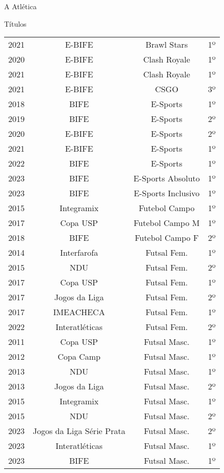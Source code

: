 \begin{secao}{A Atlética}
\begin{subsecao}{Títulos}
\begin{center}
\begin{tabular}{|c|c|c|c|}
    2021 & E-BIFE         & Brawl Stars     & 1º\\
    2020 & E-BIFE         & Clash Royale    & 1º\\
    2021 & E-BIFE         & Clash Royale    & 1º\\
    2021 & E-BIFE         & CSGO            & 3º\\
    2018 & BIFE           & E-Sports        & 1º\\
    2019 & BIFE           & E-Sports        & 2º\\
    2020 & E-BIFE         & E-Sports        & 2º\\
    2021 & E-BIFE         & E-Sports        & 1º\\
    2022 & BIFE           & E-Sports        & 1º\\
    2023 & BIFE           & E-Sports Absoluto  & 1º\\
    2023 & BIFE           & E-Sports Inclusivo & 1º\\
    2015 & Integramix     & Futebol Campo   & 1º\\
    2017 & Copa USP       & Futebol Campo M & 1º\\
    2018 & BIFE           & Futebol Campo F & 2º\\
    2014 & Interfarofa    & Futsal Fem.     & 1º\\
    2015 & NDU            & Futsal Fem.     & 2º\\
    2017 & Copa USP       & Futsal Fem.     & 1º\\
    2017 & Jogos da Liga  & Futsal Fem.     & 2º\\
    2017 & IMEACHECA      & Futsal Fem.     & 1º\\
    2022 & Interatléticas & Futsal Fem.     & 2º\\
    2011 & Copa USP       & Futsal Masc.    & 1º\\
    2012 & Copa Camp      & Futsal Masc.    & 1º\\
    2013 & NDU            & Futsal Masc.    & 1º\\
    2013 & Jogos da Liga  & Futsal Masc.    & 2º\\
    2015 & Integramix     & Futsal Masc.    & 1º\\
    2015 & NDU            & Futsal Masc.    & 2º\\
    2023 & Jogos da Liga Série Prata & Futsal Masc. & 2º\\
    2023 & Interatléticas & Futsal Masc.    & 1º\\
    2023 & BIFE           & Futsal Masc.    & 1º\\

\end{tabular}
\end{center}
\end{subsecao}
\end{secao}

